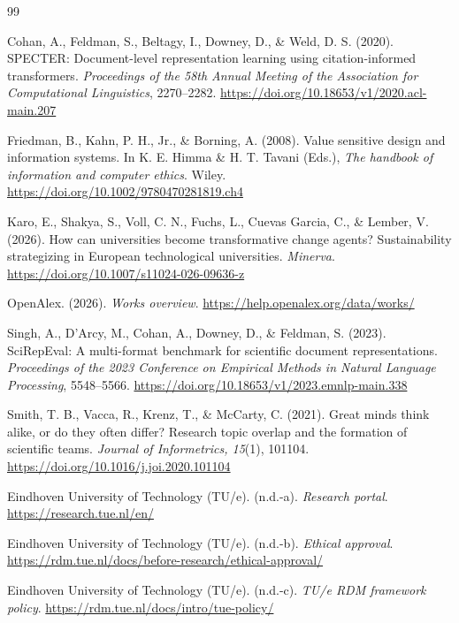 \documentclass[11pt,a4paper]{article}
\begin{document}
\begin{thebibliography}{99}

Cohan, A., Feldman, S., Beltagy, I., Downey, D., \& Weld, D. S. (2020).
SPECTER: Document-level representation learning using citation-informed transformers.
\emph{Proceedings of the 58th Annual Meeting of the Association for Computational Linguistics}, 2270--2282.
\url{https://doi.org/10.18653/v1/2020.acl-main.207}

Friedman, B., Kahn, P. H., Jr., \& Borning, A. (2008).
Value sensitive design and information systems.
In K. E. Himma \& H. T. Tavani (Eds.), \emph{The handbook of information and computer ethics}. Wiley.
\url{https://doi.org/10.1002/9780470281819.ch4}

Karo, E., Shakya, S., Voll, C. N., Fuchs, L., Cuevas Garcia, C., \& Lember, V. (2026).
How can universities become transformative change agents? Sustainability strategizing in European technological universities.
\emph{Minerva}.
\url{https://doi.org/10.1007/s11024-026-09636-z}

OpenAlex. (2026).
\emph{Works overview}.
\url{https://help.openalex.org/data/works/}

Singh, A., D'Arcy, M., Cohan, A., Downey, D., \& Feldman, S. (2023).
SciRepEval: A multi-format benchmark for scientific document representations.
\emph{Proceedings of the 2023 Conference on Empirical Methods in Natural Language Processing}, 5548--5566.
\url{https://doi.org/10.18653/v1/2023.emnlp-main.338}

Smith, T. B., Vacca, R., Krenz, T., \& McCarty, C. (2021).
Great minds think alike, or do they often differ? Research topic overlap and the formation of scientific teams.
\emph{Journal of Informetrics, 15}(1), 101104.
\url{https://doi.org/10.1016/j.joi.2020.101104}

Eindhoven University of Technology (TU/e). (n.d.-a).
\emph{Research portal}.
\url{https://research.tue.nl/en/}

Eindhoven University of Technology (TU/e). (n.d.-b).
\emph{Ethical approval}.
\url{https://rdm.tue.nl/docs/before-research/ethical-approval/}

Eindhoven University of Technology (TU/e). (n.d.-c).
\emph{TU/e RDM framework policy}.
\url{https://rdm.tue.nl/docs/intro/tue-policy/}

\end{thebibliography}
\end{document}
